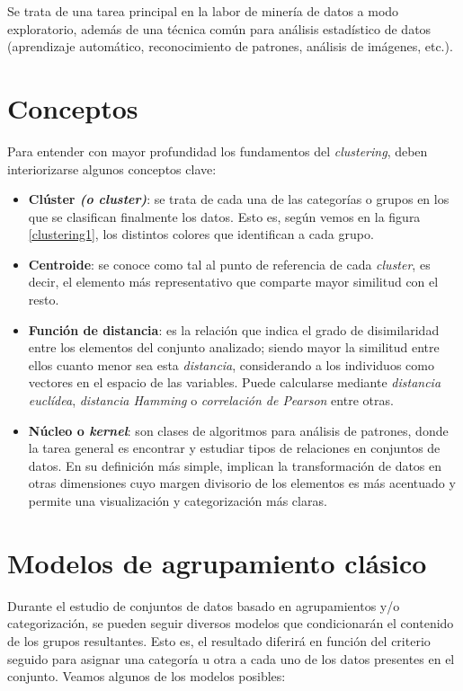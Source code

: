 \documentclass[]{report}
\begin{document}
			Se trata de una tarea principal en la labor de minería de datos a modo exploratorio, además de una técnica común para análisis estadístico de datos (aprendizaje automático, reconocimiento de patrones, análisis de imágenes, etc.).
					
		\section{Conceptos}
		
			Para entender con mayor profundidad los fundamentos del \textit{clustering}, deben interiorizarse algunos conceptos clave:
			
			\begin{itemize}
				\item \textbf{Clúster \textit{(o cluster)}}: se trata de cada una de las categorías o grupos en los que se clasifican finalmente los datos. Esto es, según vemos en la figura \ref{clustering1}, los distintos colores que identifican a cada grupo.
				\item \textbf{Centroide}: se conoce como tal al punto de referencia de cada \textit{cluster}, es decir, el elemento más representativo que comparte mayor similitud con el resto.
				\item \textbf{Función de distancia}: es la relación que indica el grado de disimilaridad entre los elementos del conjunto analizado; siendo mayor la similitud entre ellos cuanto menor sea esta \textit{distancia}, considerando a los individuos como vectores en el espacio de las variables. Puede calcularse mediante \textit{distancia euclídea}, \textit{distancia Hamming} o \textit{correlación de Pearson} entre otras.
				\item \textbf{Núcleo o \textit{kernel}}: son clases de algoritmos para análisis de patrones, donde la tarea general es encontrar y estudiar tipos de relaciones en conjuntos de datos. En su definición más simple, implican la transformación de datos en otras dimensiones cuyo margen divisorio de los elementos es más acentuado y permite una visualización y categorización más claras.
			\end{itemize}
		
		\section{Modelos de agrupamiento clásico}
		
			Durante el estudio de conjuntos de datos basado en agrupamientos y/o categorización, se pueden seguir diversos modelos que condicionarán el contenido de los grupos resultantes. Esto es, el resultado diferirá en función del criterio seguido para asignar una categoría u otra a cada uno de los datos presentes en el conjunto. Veamos algunos de los modelos posibles:
		
\end{document}
